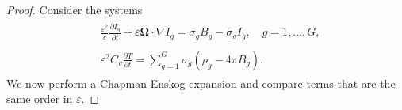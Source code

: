 \documentclass[preprint,12pt]{elsarticle}
\theoremstyle{definition}
\theoremstyle{plain}
\numberwithin{equation}{section}
\numberwithin{algorithm}{section}
\newcounter{eq_count}
\newcounter{subeq_count}
\newcommand{\vOmega}{\mathbf{\Omega}}
\begin{document}
\begin{proof}
    Consider the systems
           \begin{subequations}
		\begin{align}
        \label{eq_asymptoticAnalysis1A}
            &\begin{aligned}
                \frac{\varepsilon^2}{c} \frac{\partial I_g}{\partial t}+\varepsilon \vOmega \cdot \nabla I_g = \sigma_{g}B_g-\sigma_{g}I_g,  \quad g=1,\ldots,G, 
            \end{aligned}
            \\
            \label{eq_asymptoticAnalysis1B}
		  &\begin{aligned}
                \varepsilon^2 C_v \frac{\partial T}{\partial t}=\sum_{g=1}^{G} \sigma_{g} \left( \rho_g- 4 \pi B_g  \right). 
            \end{aligned}
		\end{align}
   \end{subequations}
   We now perform a Chapman-Enskog expansion and compare terms that are the same order in $\varepsilon$.
   

\end{proof}
\end{document}
